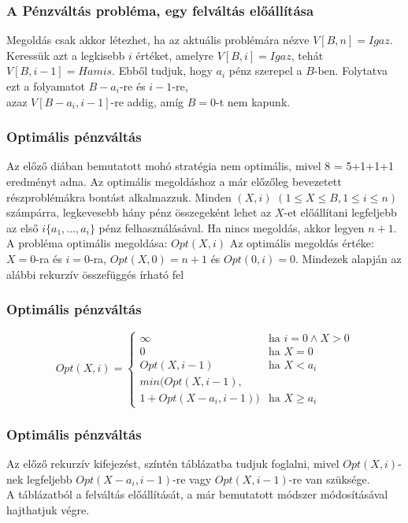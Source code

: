 \documentclass{beamer}
\begin{document}
\begin{frame}
    \frametitle{A Pénzváltás probléma, egy felváltás előállítása}
    Megoldás csak akkor létezhet, ha az aktuális problémára nézve \(V[B,n]=Igaz\). \newline
    Keressük azt a legkisebb \(i\) értéket, amelyre \(V[B,i]=Igaz\), tehát $V[B,i-1]=Hamis$. \newline
    Ebből tudjuk, hogy \(a_i\) pénz szerepel a \(B\)-ben.\newline
    Folytatva ezt a folyamatot \(B-a_i\)-re és \(i-1\)-re,\\ azaz $V[B-a_i,i-1]$-re addig, amíg $B=0$-t nem kapunk.
\end{frame}
\begin{frame}
    \frametitle{Optimális pénzváltás}
    Az előző diában bemutatott mohó stratégia nem optimális, mivel 8 = 5+1+1+1 eredményt adna.\newline
    Az optimális megoldáshoz a már előzőleg bevezetett részproblémákra bontást alkalmazzuk.\newline
    Minden \((X,i)\) \((1 \leq X \leq B, 1 \leq i \leq n)\) számpárra,\newline
    legkevesebb hány pénz összegeként lehet az \(X\)-et előállítani \newline
    legfeljebb az első \(i\{a_1,\dots,a_i\}\) pénz felhasználásával.
    Ha nincs megoldás, akkor legyen \(n+1\).\newline
    A probléma optimális megoldása: \(Opt(X,i)\)
    Az optimális megoldás értéke: \(X=0\)-ra és \(i=0\)-ra, \(Opt(X,0)=n+1\) és \(Opt(0,i)=0\).
    Mindezek alapján az alábbi rekurzív összefüggés írható fel
\end{frame}
\begin{frame}
    \frametitle{Optimális pénzváltás}
    \[
        Opt(X,i) =
    \begin{cases}
        \infty & \text{ha } i=0\wedge X>0 \\
        0 &\text{ha } X=0 \\
        Opt(X,i-1)& \text{ha } X<a_i \\
        min(Opt(X,i-1),\\1+Opt(X-a_i,i-1))& \text{ha } X \ge a_i
    \end{cases}
    \]
\end{frame}
\begin{frame}
    \frametitle{Optimális pénzváltás}
    Az előző rekurzív kifejezést, színtén táblázatba tudjuk foglalni, mivel $Opt(X,i)$-nek legfeljebb $Opt(X-a_i,i-1)$-re vagy $Opt(X,i-1)$-re van szüksége.\\
    A táblázatból a felváltás előállítását, a már bemutatott módszer módosításával hajthatjuk végre.
\end{frame}
\end{document}
